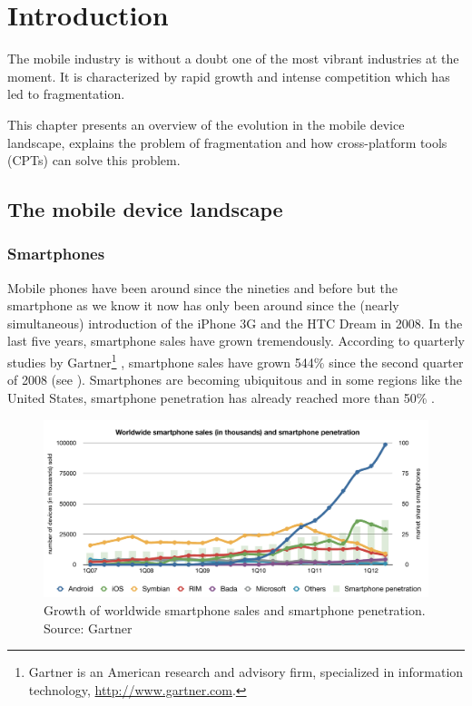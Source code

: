 \chapter{Introduction}
\label{cha:intro}

The mobile industry is without a doubt one of the most vibrant industries at the moment. It is characterized by rapid growth and intense competition which has led to fragmentation. 

This chapter presents an overview of the evolution in the mobile device landscape, explains the problem of fragmentation and how cross-platform tools (CPTs) can solve this problem.

\section{The mobile device landscape}

\subsection{Smartphones}

Mobile phones have been around since the nineties and before but the smartphone as we know it now has only been around since the (nearly simultaneous) introduction of the iPhone 3G and the HTC Dream in 2008. In the last five years, smartphone sales have grown tremendously. According to quarterly studies by Gartner\footnote{Gartner is an American research and advisory firm, specialized in information technology, \url{http://www.gartner.com}.} \citeGartner, smartphone sales have grown 544\% since the second quarter of 2008 (see ). Smartphones are becoming ubiquitous and in some regions like the United States, smartphone penetration has already reached more than 50\% \cite{Nielsen:2012}. 

\begin{figure}[h!]
    \begin{center}
        \includegraphics[width=\textwidth]{figs/smartphone_sales.pdf}
        	\caption{
        	    Growth of worldwide smartphone sales and smartphone penetration.\newline
        	    Source: Gartner \citeGartner
        	}
        	\label{fig:smartphone-sales}
    \end{center}
\end{figure}

